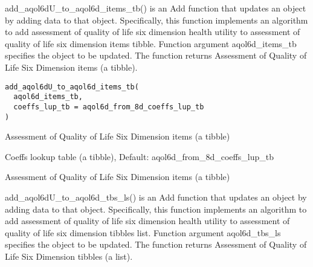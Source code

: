 \documentclass[a4paper]{book}
\begin{document}
%
\begin{Description}\relax
add\_aqol6dU\_to\_aqol6d\_items\_tb() is an Add function that updates an object by adding data to that object. Specifically, this function implements an algorithm to add assessment of quality of life six dimension health utility to assessment of quality of life six dimension items tibble. Function argument aqol6d\_items\_tb specifies the object to be updated. The function returns Assessment of Quality of Life Six Dimension items (a tibble).
\end{Description}
%
\begin{Usage}
\begin{verbatim}
add_aqol6dU_to_aqol6d_items_tb(
  aqol6d_items_tb,
  coeffs_lup_tb = aqol6d_from_8d_coeffs_lup_tb
)
\end{verbatim}
\end{Usage}
%
\begin{Arguments}
\begin{ldescription}
\item[\code{aqol6d\_items\_tb}] Assessment of Quality of Life Six Dimension items (a tibble)

\item[\code{coeffs\_lup\_tb}] Coeffs lookup table (a tibble), Default: aqol6d\_from\_8d\_coeffs\_lup\_tb
\end{ldescription}
\end{Arguments}
%
\begin{Value}
Assessment of Quality of Life Six Dimension items (a tibble)
\end{Value}
%
\begin{Description}\relax
add\_aqol6dU\_to\_aqol6d\_tbs\_ls() is an Add function that updates an object by adding data to that object. Specifically, this function implements an algorithm to add assessment of quality of life six dimension health utility to assessment of quality of life six dimension tibbles list. Function argument aqol6d\_tbs\_ls specifies the object to be updated. The function returns Assessment of Quality of Life Six Dimension tibbles (a list).
\end{Description}
\end{document}
